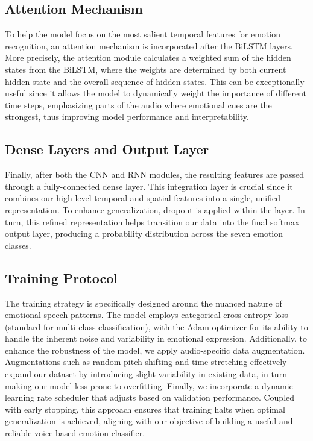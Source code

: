 \documentclass[../main.tex]{subfiles}
\begin{document}
\subsection{Attention Mechanism}
To help the model focus on the most salient temporal features for emotion 
recognition, an attention mechanism is incorporated after the BiLSTM layers. 
More precisely, the attention module calculates a weighted sum of the hidden 
states from the BiLSTM, where the weights are determined by both current hidden 
state and the overall sequence of hidden states. This can be exceptionally 
useful since it allows the model to dynamically weight the importance of 
different time steps, emphasizing parts of the audio where emotional cues are 
the strongest, thus improving model performance and interpretability.

\subsection{Dense Layers and Output Layer}
Finally, after both the CNN and RNN modules, the resulting features are passed 
through a fully-connected dense layer. This integration layer is crucial since 
it combines our high-level temporal and spatial features into a single, unified 
representation. To enhance generalization, dropout is applied within the layer. 
In turn, this refined representation helps transition our data into the final 
softmax output layer, producing a probability distribution across the seven 
emotion classes.

\subsection{Training Protocol}
The training strategy is specifically designed around the nuanced nature of 
emotional speech patterns. The model employs categorical cross-entropy loss 
(standard for multi-class classification), with the Adam optimizer for its 
ability to handle the inherent noise and variability in emotional expression. 
Additionally, to enhance the robustness of the model, we apply audio-specific 
data augmentation. Augmentations such as random pitch shifting and 
time-stretching effectively expand our dataset by introducing slight variability 
in existing data, in turn making our model less prone to overfitting. Finally, 
we incorporate a dynamic learning rate scheduler that adjusts based on 
validation performance. Coupled with early stopping, this approach ensures 
that training halts when optimal generalization is achieved, aligning with our 
objective of building a useful and reliable voice-based emotion classifier.
\end{document}
